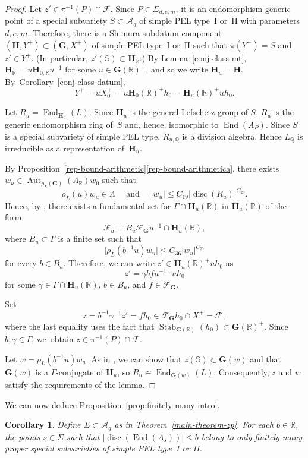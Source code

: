 \documentclass[JEP,XML,SOM,Unicode,NoFloatCountersInSection]{cedram}
\newcommand{\bQ}{\mathbb{Q}}
\newcommand{\bR}{\mathbb{R}}
\newcommand{\bS}{\mathbb{S}}
\newcommand{\cF}{\mathcal{F}}
\newcommand{\Ag}{\mathcal{A}_g}
\newcommand{\gG}{\mathbf{G}}
\newcommand{\gH}{\mathbf{H}}
\DeclareMathOperator{\Aut}{Aut}
\DeclareMathOperator{\disc}{disc}
\DeclareMathOperator{\End}{End}
\DeclareMathOperator{\Stab}{Stab}
\newcommand{\abs}[1]{\lvert #1 \rvert}
\newtheorem{corollary}[lemma]{Corollary}
\begin{document}
\begin{proof}
Let $z'\in \pi^{-1}(P)\cap\cF$.
Since $P\in\Sigma_{d,e,m}$, it is an endomorphism generic point of a special subvariety $S \subset \Ag$ of simple PEL type~I or~II with parameters $d,e,m$.
Therefore, there is a Shimura subdatum component $(\gH, Y^+) \subset (\gG, X^+)$ of simple PEL type~I or~II such that $\pi(Y^+) = S$ and $z' \in Y^+$. (In particular, $z'(\mathbb{S})\subset\gH_{\bR}$.) By Lemma~\ref{conj-class-mt}, $\gH_{\bR} = u\gH_{0,\bR}u^{-1}$ for some $u\in\gG(\bR)^+$, and so we write $\gH_u=\gH$.
By~Corol\-lary~\ref{conj-class-datum},
\[Y^+=uX^+_0=u\gH_0(\bR)^+h_0=\gH_u(\bR)^+uh_0.
\]

Let $R_u = \End_{\gH_u}(L)$.
Since $\gH_u$ is the general Lefschetz group of $S$, $R_u$ is the generic endomorphism ring of~$S$ and, hence, isomorphic to $\End(A_P)$. Since $S$ is a special subvariety of simple PEL type, $R_{u,\bQ}$ is a division algebra.
Hence $L_\bQ$ is irreducible as a representation of~$\gH_u$.

By Proposition~\ref{rep-bound-arithmetic}\eqref{rep-bound-arithmetica}, there exists $w_u \in \Aut_{\rho_L(\gG)}(\Lambda_\bR) w_0$ such that
\[
\rho_L(u) w_u \in \Lambda \quad \text{ and } \quad \abs{w_u} \leq C_{19} \abs{\disc(R_u)}^{C_{20}}.
\]
Hence, by \cite[Th.\,1.2]{QRTUI}, there exists a fundamental set for $\Gamma\cap\gH_u(\bR)$ in $\gH_u(\bR)$ of the form
\[
\cF_u=B_u\cF_\gG u^{-1}\cap\gH_u(\bR),\]
where $B_u\subset\Gamma$ is a finite set such that
\[\abs{\rho_L(b^{-1}u)w_u} \leq C_{36} \abs{w_u}^{C_{37}}\]
for every $b\in B_u$.
Therefore, we can write $z' \in \gH_u(\bR)^+ uh_0$ as
\[
z' = \gamma b f u^{-1}\cdot uh_0
\]
for some $\gamma \in \Gamma \cap \gH_u(\bR)$, $b \in B_u$, and $f \in \cF_\gG$.

Set
\[
z = b^{-1}\gamma^{-1}z' = fh_0 \in \cF_\gG h_0\cap X^+=\cF,
\]
where the last equality uses the fact that $\Stab_{\gG(\bR)}(h_0)\subset\gG(\bR)^+$.
Since $b, \gamma \in \Gamma$, we~obtain $z \in \pi^{-1}(P) \cap \cF$.

Let $w=\rho_L(b^{-1}u)w_u$.
As in \cite[Prop.\,6.3]{QRTUI}, we can show that $z(\bS) \subset \gG(w)$ and that $\gG(w)$ is a $\Gamma$-conjugate of $\gH_u$, so $R_u \cong \End_{\gG(w)}(L)$.
Consequently, $z$ and $w$ satisfy the requirements of the lemma.
\end{proof}

We can now deduce Proposition~\ref{prop:finitely-many-intro}.

\begin{corollary}\label{prop:finitely-many}
Define $\Sigma \subset \Ag$ as in Theorem~\ref{main-theorem-zp}.
For each $b\in\bR$, the points $s\in\Sigma$ such that $\abs{\disc(\End(A_s))} \leq b$ belong to only finitely many proper special subvarieties of simple PEL type~I or II.
\end{corollary}
\end{document}
